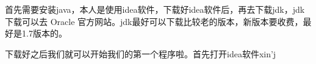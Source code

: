 

首先需要安装java，本人是使用idea软件，下载好idea软件后，再去下载jdk，jdk下载可以去 Oracle 官方网站。jdk最好可以下载比较老的版本，新版本要收费，最好是1.7版本的。

下载好之后我们就可以开始我们的第一个程序啦。首先打开idea软件xin'j